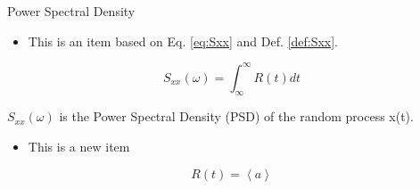 \documentclass{beamer}
\begin{document}
\begin{frame}{Power Spectral Density}

\begin{itemize}
\item This is an item based on Eq. \ref{eq:Sxx} and Def. \ref{def:Sxx}.
\end{itemize}
\begin{equation}
S_{xx}(\omega)=\int_{\infty}^{\infty}R(t)dt
\label{eq:Sxx}
\end{equation}

\begin{Definition}
$S_{xx}(\omega)$ is the Power Spectral Density (PSD) of the random process x(t). 
\label{def:Sxx}
\end{Definition}

\label{fr:1}
\end{frame}


\begin{frame}{}
\begin{itemize}
\item This is a new item
\end{itemize}

\begin{equation}
R(t)=\left<a\right>
\end{equation}

\end{frame}
\end{document}
